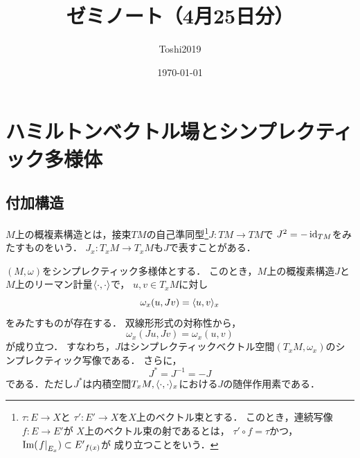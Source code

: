 \newcommand{\cotn}[1][]{\dot{T}^{\ast}{#1}}


\newcommand{\muhom}{\mu hom}
\newcommand{\muHom}[1][]{\mathrm{Hom}^\mu_{\raise1.5ex\hbox to.1em{}#1}}

\newcommand{\mucat}[2][]{\mathsf{D}^{\mathrm{b}}_{#1}(#2)}

\newcommand{\conv}[1][]{\mathbin{\mathop{\circ}\limits_{#1}}}

\newcommand{\torus}{\mathbf{T}}




\title{ゼミノート（4月25日分）}
\author{Toshi2019}
\date{\today}

\maketitle
\tableofcontents
\section{ハミルトンベクトル場とシンプレクティック多様体}
\subsection*{付加構造}
\(M\)上の概複素構造とは，接束\(TM\)の自己準同型\footnote{
    \(\tau\colon E\to X\)と
    \(\tau'\colon E'\to X\)を\(X\)上のベクトル束とする．
    このとき，連続写像\(f\colon E\to E'\)が
    \(X\)上のベクトル束の射であるとは，
    \(\tau'\circ f=\tau\)かつ，
    \(\im(\mres[f]{{E}_{x}})\subset {E'}_{f(x)}\)が
    成り立つことをいう．
}\(J\colon TM\to TM\)で
\(J^2=-\id_{TM}\)をみたすものをいう．
\(J_x\colon T_{x}M\to T_{x}M\)も\(J\)で表すことがある．

\begin{PRP}
    \((M,\omega)\)をシンプレクティック多様体とする．
    このとき，\(M\)上の概複素構造\(J\)と
    \(M\)上のリーマン計量\(\inner<\cdot,\cdot>\)で，
    \(u,v\in T_{x}M\)に対し\begin{equation}
        \omega_{x}(u,Jv)=\inner<u,v>_{x}\label{eq:1.34}
    \end{equation}
    をみたすものが存在する．
    双線形形式の対称性から，
    \begin{equation}
        \omega_{x}(Ju,Jv)=\omega_{x}(u,v)\label{eq:1.35}
    \end{equation}
    が成り立つ．
    すなわち，\(J\)はシンプレクティックベクトル空間\(
        (T_{x}M,\omega_x)
    \)のシンプレクティック写像である．
    さらに，
    \begin{equation}
        J^{\ast}=J^{-1}=-J\label{eq:1.36}
    \end{equation}
    である．ただし\(J^{\ast}\)は内積空間\(
        T_{x}M,\inner<\cdot,\cdot>_{x}
    \)における\(J\)の随伴作用素である．
\end{PRP}

